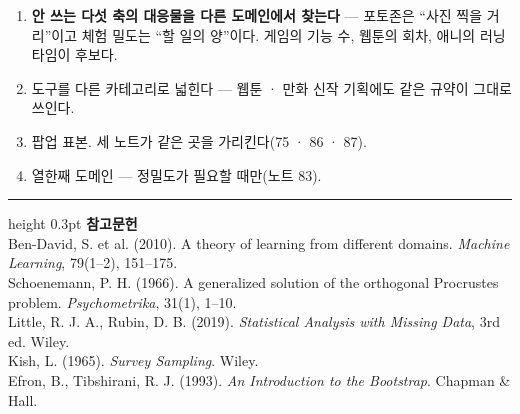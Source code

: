 \documentclass[10pt]{article}
\begin{document}
\begin{enumerate}[leftmargin=1.3em,itemsep=0.15em]
\item \textbf{안 쓰는 다섯 축의 대응물을 다른 도메인에서 찾는다} --- 포토존은
      ``사진 찍을 거리''이고 체험 밀도는 ``할 일의 양''이다. 게임의 기능 수,
      웹툰의 회차, 애니의 러닝타임이 후보다.
\item 도구를 다른 카테고리로 넓힌다 --- 웹툰 · 만화 신작 기획에도 같은 규약이
      그대로 쓰인다.
\item 팝업 표본. 세 노트가 같은 곳을 가리킨다(75 · 86 · 87).
\item 열한째 도메인 --- 정밀도가 필요할 때만(노트 83).
\end{enumerate}

\vspace{0.6em}
\hrule height 0.3pt
\vspace{0.5em}
{\footnotesize
\textbf{참고문헌}\\[0.3em]
Ben-David, S. et al. (2010). A theory of learning from different domains.
\emph{Machine Learning}, 79(1--2), 151--175.\\[0.15em]
Schoenemann, P. H. (1966). A generalized solution of the orthogonal Procrustes
problem. \emph{Psychometrika}, 31(1), 1--10.\\[0.15em]
Little, R. J. A., Rubin, D. B. (2019). \emph{Statistical Analysis with Missing
Data}, 3rd ed. Wiley.\\[0.15em]
Kish, L. (1965). \emph{Survey Sampling}. Wiley.\\[0.15em]
Efron, B., Tibshirani, R. J. (1993). \emph{An Introduction to the Bootstrap}.
Chapman \& Hall.
}
\end{document}
